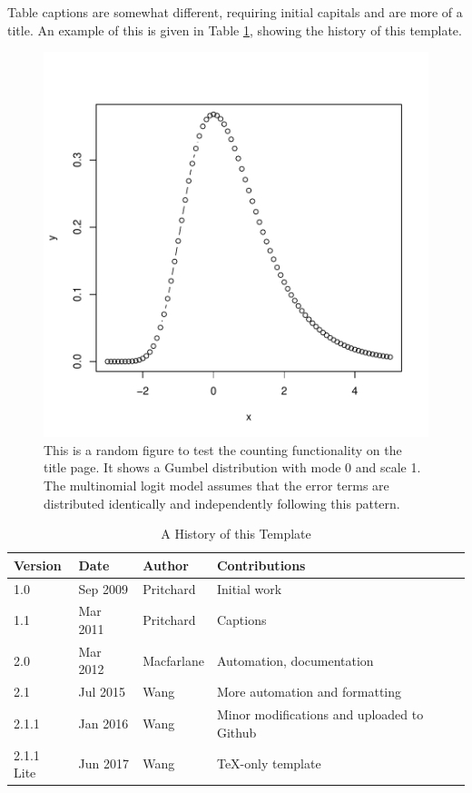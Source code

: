 \documentclass{trb_unofficial}
\begin{document}
Table captions are somewhat different, requiring initial capitals and are more of a
title. An example of this is given in Table \ref{tab:versions}, showing the
history of this template.

\begin{figure}[t]
  \centering
\includegraphics{trb_template-gumbel}
\caption{This is a random figure to test the counting functionality on the
title page. It shows a Gumbel distribution with mode 0 and scale 1. The
multinomial logit model assumes that the error terms are distributed identically
and independently following this pattern.}
	\label{fig:trial}
\end{figure}

\begin{table}[t]
  \caption{A History of this Template}
	\label{tab:versions}
\begin{center}
	\begin{tabular}{l l l l}
Version & Date & Author & Contributions \\\hline
1.0   & Sep 2009 & Pritchard & Initial work \\
1.1   & Mar 2011 & Pritchard & Captions \\
2.0   & Mar 2012 & Macfarlane& Automation, documentation\\
2.1   & Jul 2015 & Wang      & More automation and formatting\\
2.1.1 & Jan 2016 & Wang      & Minor modifications and uploaded to Github\\
2.1.1 Lite & Jun 2017 & Wang & TeX-only template \\\hline
\end{tabular}
\end{center}
\end{table}
\end{document}

